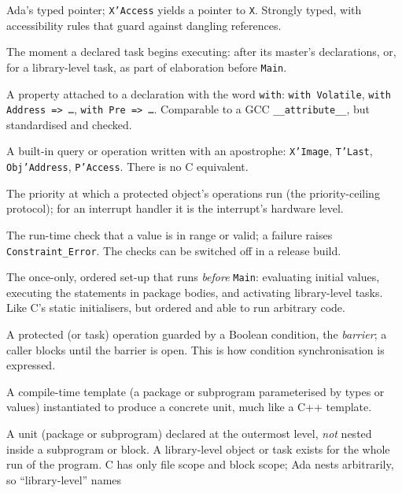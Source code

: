 \begin{description}[style=nextline]
\item[Access type / \texttt{'Access}.] Ada's typed pointer; \texttt{X'Access}
  yields a pointer to \texttt{X}. Strongly typed, with accessibility rules that
  guard against dangling references.
\item[Activation.] The moment a declared task begins executing: after its master's
  declarations, or, for a library-level task, as part of elaboration before
  \texttt{Main}.
\item[Aspect.] A property attached to a declaration with the word \texttt{with}:
  \texttt{with Volatile}, \texttt{with Address => \ldots}, \texttt{with Pre =>
  \ldots}. Comparable to a GCC \texttt{\_\_attribute\_\_}, but standardised and
  checked.
\item[Attribute.] A built-in query or operation written with an apostrophe:
  \texttt{X'Image}, \texttt{T'Last}, \texttt{Obj'Address}, \texttt{P'Access}. There
  is no C equivalent.
\item[Ceiling priority.] The priority at which a protected object's operations
  run (the priority-ceiling protocol); for an interrupt handler it is the
  interrupt's hardware level.
\item[Constraint check / \texttt{Constraint\_Error}.] The run-time check that a
  value is in range or valid; a failure raises \texttt{Constraint\_Error}. The
  checks can be switched off in a release build.
\item[Elaboration.] The once-only, ordered set-up that runs \emph{before}
  \texttt{Main}: evaluating initial values, executing the statements in package
  bodies, and activating library-level tasks. Like C's static initialisers, but
  ordered and able to run arbitrary code.
\item[Entry / barrier.] A protected (or task) operation guarded by a Boolean
  condition, the \emph{barrier}; a caller blocks until the barrier is open. This is
  how condition synchronisation is expressed.
\item[Generic.] A compile-time template (a package or subprogram parameterised
  by types or values) instantiated to produce a concrete unit, much like a C++
  template.
\item[Library unit / library-level.] A unit (package or subprogram) declared at
  the outermost level, \emph{not} nested inside a subprogram or block. A
  library-level object or task exists for the whole run of the program. C has only
  file scope and block scope; Ada nests arbitrarily, so ``library-level'' names

\end{description}
